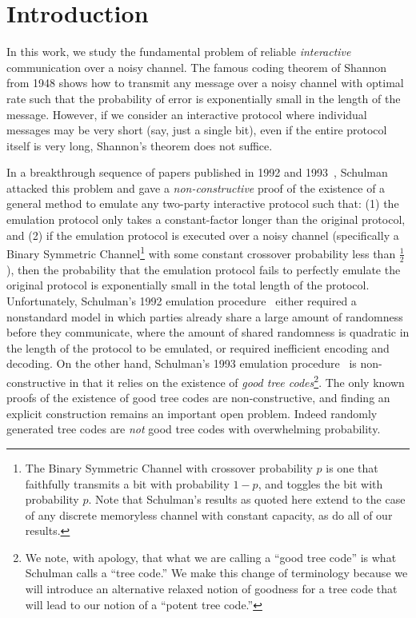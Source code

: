 \documentclass[ letterpaper, 11pt]{article}
\newcommand{\potent}{potent\xspace}
\begin{document}
\thispagestyle{empty}   \newpage
\setcounter{page}{1}









\section{Introduction}


In this work, we study the fundamental problem of reliable
\emph{interactive} communication over a noisy channel.  The famous
coding theorem of Shannon~\cite{shannon48} from 1948 shows how to
transmit any message over a noisy channel with optimal rate such
that the probability of error is exponentially small in the length
of the message.  However, if we consider an interactive protocol
where individual messages may be very short (say, just a single
bit), even if the entire protocol itself is very long, Shannon's
theorem does not suffice.

In a breakthrough sequence of papers published in 1992 and
1993~\cite{schulman92,schulman93}, Schulman attacked this problem
and gave a \emph{non-constructive} proof of the existence of a
general method to emulate any two-party interactive protocol such
that: (1) the emulation protocol only takes a constant-factor longer
than the original protocol, and (2) if the emulation protocol is
executed over a noisy channel (specifically a Binary Symmetric
Channel\footnote{The Binary Symmetric Channel with crossover
probability $p$ is one that faithfully transmits a bit with
probability $1-p$, and toggles the bit with probability $p$.  Note
that Schulman's results as quoted here extend to the case of any
discrete memoryless channel with constant capacity, as do all of our
results.} with some constant crossover probability less than
$\frac12$), then the probability that the emulation protocol fails
to perfectly emulate the original protocol 
is exponentially small in the total length of the protocol.
Unfortunately, Schulman's 1992 emulation procedure~\cite{schulman92}
either required a nonstandard model in which parties already share a
large amount of randomness before they communicate, where the amount
of shared randomness is quadratic in the length of the protocol to
be emulated, or required inefficient encoding and decoding. On the
other hand, Schulman's 1993 emulation procedure~\cite{schulman93}
 is non-constructive in that it
relies on the existence of \emph{good tree codes}\footnote{ We note,
with apology, that what we are calling a ``good tree code'' is what
Schulman calls a ``tree code.''  We make this change of terminology
because we will introduce an alternative relaxed notion of goodness
for a tree code that will lead to our notion of a ``\potent tree
code.'' }.  The only known proofs of the existence of good tree
codes are non-constructive, and finding an explicit construction
remains an important open problem.  Indeed randomly generated tree
codes are \emph{not} good tree codes with overwhelming probability.
\end{document}
